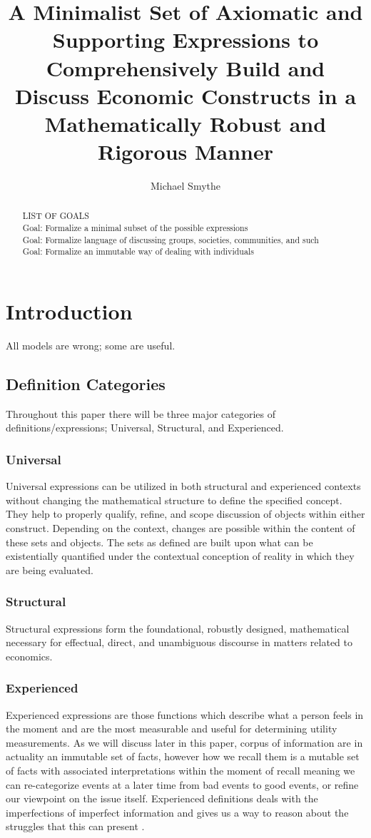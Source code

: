 \documentclass[]{article}
\title{A Minimalist Set of Axiomatic and Supporting Expressions to Comprehensively Build and Discuss Economic Constructs in a Mathematically Robust and Rigorous Manner}
\author{Michael Smythe}
\begin{document}
\maketitle

\begin{abstract}
LIST OF GOALS
\\Goal: Formalize a minimal subset of the possible expressions
\\Goal: Formalize language of discussing groups, societies, communities, and such
\\Goal: Formalize an immutable way of dealing with individuals
\end{abstract}
\section*{Introduction}
All models are wrong; some are useful. 
\subsection*{Definition Categories}
Throughout this paper there will be three major categories of definitions/expressions; Universal, Structural, and Experienced.
%
\subsubsection*{Universal}
Universal expressions can be utilized in both structural and experienced contexts without changing the mathematical structure to define the specified concept. They help to properly qualify, refine, and scope discussion of objects within either construct. Depending on the context, changes are possible within the content of these sets and objects. The sets as defined are built upon what can be existentially quantified under the contextual conception of reality in which they are being evaluated.   
%
\subsubsection*{Structural}
Structural expressions form the foundational, robustly designed, mathematical necessary for effectual, direct, and unambiguous discourse in matters related to economics. 
%
%
\subsubsection*{Experienced}
Experienced expressions are those functions which describe what a person feels in the moment and are the most measurable and useful for determining utility measurements. As we will discuss later in this paper, corpus of information are in actuality an immutable set of facts, however how we recall them is a mutable set of facts with associated interpretations within the moment of recall meaning we can re-categorize events at a later time from bad events to good events, or refine our viewpoint on the issue itself. Experienced definitions deals with the imperfections of imperfect information and gives us a way to reason about the struggles that this can present .
\end{document}
